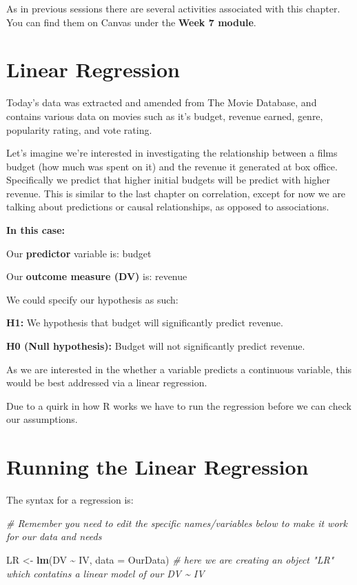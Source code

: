 \documentclass[
]{book}
\newenvironment{Shaded}{\begin{snugshade}}{\end{snugshade}}
\newcommand{\AttributeTok}[1]{\textcolor[rgb]{0.13,0.29,0.53}{#1}}
\newcommand{\CommentTok}[1]{\textcolor[rgb]{0.56,0.35,0.01}{\textit{#1}}}
\newcommand{\FunctionTok}[1]{\textcolor[rgb]{0.13,0.29,0.53}{\textbf{#1}}}
\newcommand{\NormalTok}[1]{#1}
\newcommand{\OtherTok}[1]{\textcolor[rgb]{0.56,0.35,0.01}{#1}}
\newcommand{\SpecialCharTok}[1]{\textcolor[rgb]{0.81,0.36,0.00}{\textbf{#1}}}
\begin{document}
As in previous sessions there are several activities associated with this chapter. You can find them on Canvas under the \textbf{Week 7 module}.

\section{Linear Regression}\label{linear-regression}

Today's data was extracted and amended from The Movie Database, and contains various data on movies such as it's budget, revenue earned, genre, popularity rating, and vote rating.

Let's imagine we're interested in investigating the relationship between a films budget (how much was spent on it) and the revenue it generated at box office. Specifically we predict that higher initial budgets will be predict with higher revenue. This is similar to the last chapter on correlation, except for now we are talking about predictions or causal relationships, as opposed to associations.

\textbf{In this case:}

Our \textbf{predictor} variable is: budget

Our \textbf{outcome measure (DV)} is: revenue

We could specify our hypothesis as such:

\textbf{H1:} We hypothesis that budget will significantly predict revenue.

\textbf{H0 (Null hypothesis):} Budget will not significantly predict revenue.

As we are interested in the whether a variable predicts a continuous variable, this would be best addressed via a linear regression.

Due to a quirk in how R works we have to run the regression before we can check our assumptions.

\section{Running the Linear Regression}\label{running-the-linear-regression}

The syntax for a regression is:

\begin{Shaded}
\begin{Highlighting}[]
\CommentTok{\# Remember you need to edit the specific names/variables below to make it work for our data and needs}

\NormalTok{LR }\OtherTok{\textless{}{-}} \FunctionTok{lm}\NormalTok{(DV }\SpecialCharTok{\textasciitilde{}}\NormalTok{ IV, }\AttributeTok{data =}\NormalTok{ OurData) }\CommentTok{\# here we are creating an object "LR" which contatins a linear model of our DV \textasciitilde{} IV }
\end{Highlighting}
\end{Shaded}
\end{document}
